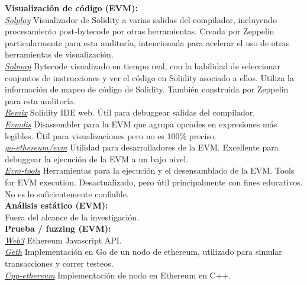 \textbf{Visualización de código (EVM):}\\

\underline{\textit{Solplay}}\cite{SolplayLink}
Visualizador de Solidity a varias salidas del compilador, incluyendo procesamiento post-bytecode por otras herramientas. Creada por Zeppelin particularmente para esta auditoría, intencionada para acelerar el uso de otras herramientas de visualización.\\

\underline{\textit{Solmap}}\cite{SolmapLink}
Bytecode visualizado en tiempo real, con la habilidad de seleccionar conjuntos de instrucciones y ver el código en Solidity asociado a ellos. Utiliza la información de mapeo de código de Solidity. También construida por Zeppelin para esta auditoría.\\

\underline{\textit{Remix}}\cite{RemixLink}
Solidity IDE web. Útil para debuggear salidas del compilador. \\

\underline{\textit{Evmdis}}\cite{EvmdisLink}
Disassembler para la EVM que agrupa opcodes en expresiones más legibles. Útil para visualizaciones pero no es 100\% preciso.\\

\underline{\textit{go-ethereum/evm}}\cite{goEthereumLink}
Utilidad para desarrolladores de la EVM. Excellente para debuggear la ejecución de la EVM a un bajo nivel.\\

\underline{\textit{Evm-tools}}\cite{evmToolsLink}
Herramientas para la ejecución y el desensamblado de la EVM. Tools for EVM execution. Desactualizado, pero útil principalmente con fines educativos. No es lo suficientemente confiable.\\

\textbf{Análisis estático (EVM):}\\
Fuera del alcance de la investigación.\\

\textbf{Prueba / fuzzing (EVM):}\\

\underline{\textit{Web3}}\cite{Web3Link}
Ethereum Javascript API.\\

\underline{\textit{Geth}}\cite{GethLink}
Implementación en Go de un nodo de ethereum, utilizado para simular transacciones y correr testeos.\\

\underline{\textit{Cpp-ethereum}}\cite{cppEthereumLink}
Implementación de nodo en Ethereum en C++.\\

